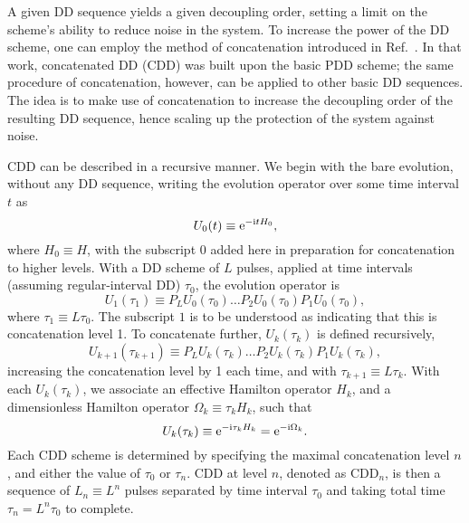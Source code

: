 \documentclass[pra,reprint,superscriptaddress]{revtex4-2}
\newcommand{\CDDn}{\mathrm{CDD}_n}
\begin{document}






A given DD sequence yields a given decoupling order, setting a limit on the scheme's ability to reduce noise in the system. To increase the power of the DD scheme, one can employ the method of concatenation introduced in Ref.~\cite{khodjasteh2005fault}. In that work, concatenated DD (CDD) was built upon the basic PDD scheme; the same procedure of concatenation, however, can be applied to other basic DD sequences. The idea is to make use of concatenation to increase the decoupling order of the resulting DD sequence, hence scaling up the protection of the system against noise.

CDD can be described in a recursive manner. We begin with the bare evolution, without any DD sequence, writing the evolution operator over some time interval $t$ as
\begin{equation}
U_0(t)\equiv \mathrm{e}^{-\mathrm{i} t H_0},
\end{equation}
where $H_0\equiv H$, with the subscript $0$ added here in preparation for concatenation to higher levels. With a DD scheme of $L$ pulses, applied at time intervals (assuming regular-interval DD) $\tau_0$, the evolution operator is
\begin{equation}
U_1(\tau_1)\equiv P_LU_0(\tau_0)\ldots P_2U_0(\tau_0)P_1U_0(\tau_0),
\end{equation}
where $\tau_1\equiv L\tau_0$. The subscript $1$ is to be understood as indicating that this is concatenation level 1. To concatenate further, $U_k(\tau_k)$ is defined recursively, 
\begin{equation}
U_{k+1}(\tau_{k+1})\equiv P_LU_k(\tau_k)\ldots P_2U_k(\tau_k)P_1U_k(\tau_k),
\end{equation}
increasing the concatenation level by 1 each time, and with $\tau_{k+1}\equiv L\tau_k$. With each $U_k(\tau_k)$, we associate an effective Hamilton operator $H_k$, and a dimensionless Hamilton operator $\Omega_k\equiv\tau_kH_k$, such that 
\begin{equation}
U_k(\tau_k)\equiv \mathrm{e}^{-\mathrm{i}\tau_k H_k}=\mathrm{e}^{-\mathrm{i}\Omega_k}.
\end{equation}
Each CDD scheme is determined by specifying the maximal concatenation level $n$, and either the value of $\tau_0$ or $\tau_n$. CDD at level $n$, denoted as $\CDDn$, is then a sequence of $L_n\equiv L^n$ pulses separated by time interval $\tau_0$ and taking total time $\tau_n=L^n\tau_0$ to complete.
\end{document}
